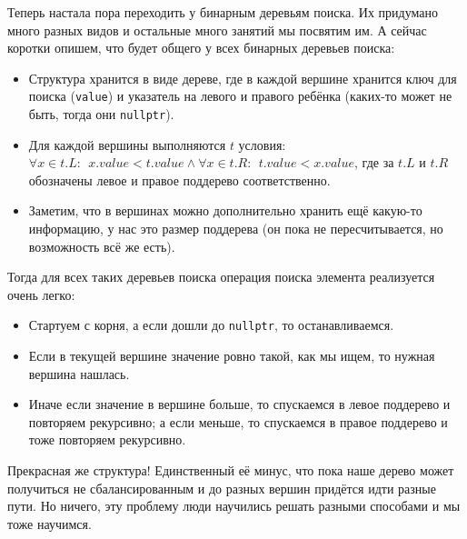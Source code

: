 Теперь настала пора переходить у бинарным деревьям поиска. Их придумано много разных видов и остальные много занятий мы посвятим им. А сейчас коротки опишем, что будет общего у всех бинарных деревьев поиска:
\begin{itemize}
    \item Структура хранится в виде дереве, где в каждой вершине хранится ключ для поиска (\texttt{value}) и указатель на левого и правого ребёнка (каких-то может не быть, тогда они \texttt{nullptr}).
    \item Для каждой вершины выполняются $t$ условия: $\forall x \in t.L:\ \ x.value < t.value \land \forall x \in t.R:\ \ t.value < x.value$, где за $t.L$ и $t.R$ обозначены левое и правое поддерево соответственно.
    \item Заметим, что в вершинах можно дополнительно хранить ещё какую-то информацию, у нас это размер поддерева (он пока не пересчитывается, но возможность всё же есть).
\end{itemize}

Тогда для всех таких деревьев поиска операция поиска элемента реализуется очень легко:
\begin{itemize}
    \item Стартуем с корня, а если дошли до \texttt{nullptr}, то останавливаемся.
    \item Если в текущей вершине значение ровно такой, как мы ищем, то нужная вершина нашлась.
    \item Иначе если значение в вершине больше, то спускаемся в левое поддерево и повторяем рекурсивно; а если меньше, то спускаемся в правое поддерево и тоже повторяем рекурсивно.
\end{itemize}

Прекрасная же структура! Единственный её минус, что пока наше дерево может получиться не сбалансированным и до разных вершин придётся идти разные пути. Но ничего, эту проблему люди научились решать разными способами и мы тоже научимся.
